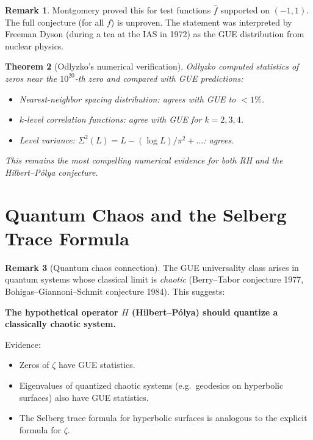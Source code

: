 \documentclass[12pt,a4paper]{amsart}
\newtheorem{theorem}{Theorem}[section]
\theoremstyle{definition}
\newtheorem{remark}[theorem]{Remark}
\begin{document}
\begin{remark}
Montgomery proved this for test functions $\hat f$ supported on $(-1,1)$.
The full conjecture (for all $f$) is unproven.
The statement was interpreted by Freeman Dyson (during a tea at the IAS
in 1972) as the GUE distribution from nuclear physics.
\end{remark}

\begin{theorem}[Odlyzko's numerical verification]
\label{thm:odlyzko_gue}
Odlyzko \cite{Odlyzko1987} computed statistics of zeros near the
$10^{20}$-th zero and compared with GUE predictions:
\begin{itemize}
  \item Nearest-neighbor spacing distribution: agrees with GUE to $< 1\%$.
  \item $k$-level correlation functions: agree with GUE for $k = 2, 3, 4$.
  \item Level variance: $\Sigma^2(L) = L - (\log L)/\pi^2 + \ldots$: agrees.
\end{itemize}
This remains the most compelling numerical evidence for both RH and the
Hilbert--P\'olya conjecture.
\end{theorem}

\section{Quantum Chaos and the Selberg Trace Formula}

\begin{remark}[Quantum chaos connection]
The GUE universality class arises in quantum systems whose classical
limit is \emph{chaotic} (Berry--Tabor conjecture 1977, Bohigas--Giannoni--Schmit
conjecture 1984).  This suggests:

\textbf{The hypothetical operator $H$ (Hilbert--P\'olya) should quantize a
classically chaotic system.}

Evidence:
\begin{itemize}
  \item Zeros of $\zeta$ have GUE statistics.
  \item Eigenvalues of quantized chaotic systems (e.g.\ geodesics on
    hyperbolic surfaces) also have GUE statistics.
  \item The Selberg trace formula for hyperbolic surfaces is analogous to
    the explicit formula for $\zeta$.
\end{itemize}
\end{remark}
\end{document}
